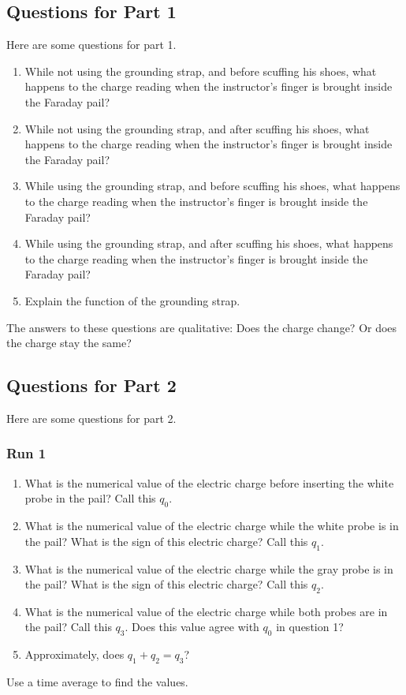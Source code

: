 \subsection{Questions for Part 1}
Here are some questions for part 1.
\begin{enumerate}
	\item While not using the grounding strap, and before scuffing his shoes, what happens to the charge reading when the instructor's finger is brought inside the Faraday pail?
	\item While not using the grounding strap, and after scuffing his shoes, what happens to the charge reading when the instructor's finger is brought inside the Faraday pail?
	\item While using the grounding strap, and before scuffing his shoes, what happens to the charge reading when the instructor's finger is brought inside the Faraday pail?
	\item While using the grounding strap, and after scuffing his shoes, what happens to the charge reading when the instructor's finger is brought inside the Faraday pail?
	\item Explain the function of the grounding strap.
\end{enumerate}
The answers to these questions are qualitative: Does the charge change? Or does the charge stay the same?
\subsection{Questions for Part 2}
Here are some questions for part 2.
\subsubsection{Run 1}
\begin{enumerate}
	\item What is the numerical value of the electric charge before inserting the white probe in the pail? Call this $q_{0}$.
	\item What is the numerical value of the electric charge while the white probe is in the pail? What is the sign of this electric charge? Call this $q_{1}$.
	\item What is the numerical value of the electric charge while the gray probe is in the pail? What is the sign of this electric charge? Call this $q_{2}$.
	\item What is the numerical value of the electric charge while both probes are in the pail? Call this $q_{3}$. Does this value agree with $q_{0}$ in question 1?
	\item Approximately, does $q_{1} + q_{2} = q_{3}$?
\end{enumerate}
Use a time average to find the values.
